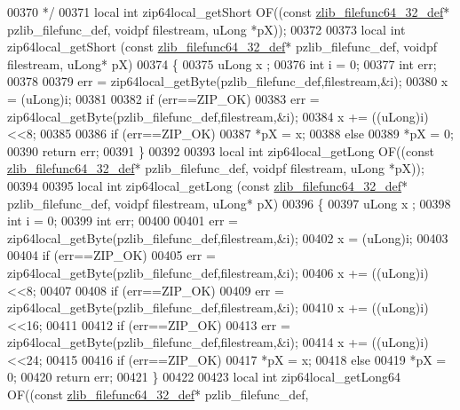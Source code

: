 \begin{DoxyCode}
00370 \textcolor{comment}{*/}
00371 local \textcolor{keywordtype}{int} zip64local\_getShort OF((\textcolor{keyword}{const} \hyperlink{structzlib__filefunc64__32__def__s}{zlib\_filefunc64\_32\_def}* pzlib\_filefunc\_def, 
      voidpf filestream, uLong *pX));
00372 
00373 local \textcolor{keywordtype}{int} zip64local\_getShort (\textcolor{keyword}{const} \hyperlink{structzlib__filefunc64__32__def__s}{zlib\_filefunc64\_32\_def}* pzlib\_filefunc\_def, 
      voidpf filestream, uLong* pX)
00374 \{
00375     uLong x ;
00376     \textcolor{keywordtype}{int} i = 0;
00377     \textcolor{keywordtype}{int} err;
00378 
00379     err = zip64local\_getByte(pzlib\_filefunc\_def,filestream,&i);
00380     x = (uLong)i;
00381 
00382     \textcolor{keywordflow}{if} (err==ZIP\_OK)
00383         err = zip64local\_getByte(pzlib\_filefunc\_def,filestream,&i);
00384     x += ((uLong)i)<<8;
00385 
00386     \textcolor{keywordflow}{if} (err==ZIP\_OK)
00387         *pX = x;
00388     \textcolor{keywordflow}{else}
00389         *pX = 0;
00390     \textcolor{keywordflow}{return} err;
00391 \}
00392 
00393 local \textcolor{keywordtype}{int} zip64local\_getLong OF((\textcolor{keyword}{const} \hyperlink{structzlib__filefunc64__32__def__s}{zlib\_filefunc64\_32\_def}* pzlib\_filefunc\_def, 
      voidpf filestream, uLong *pX));
00394 
00395 local \textcolor{keywordtype}{int} zip64local\_getLong (\textcolor{keyword}{const} \hyperlink{structzlib__filefunc64__32__def__s}{zlib\_filefunc64\_32\_def}* pzlib\_filefunc\_def, 
      voidpf filestream, uLong* pX)
00396 \{
00397     uLong x ;
00398     \textcolor{keywordtype}{int} i = 0;
00399     \textcolor{keywordtype}{int} err;
00400 
00401     err = zip64local\_getByte(pzlib\_filefunc\_def,filestream,&i);
00402     x = (uLong)i;
00403 
00404     \textcolor{keywordflow}{if} (err==ZIP\_OK)
00405         err = zip64local\_getByte(pzlib\_filefunc\_def,filestream,&i);
00406     x += ((uLong)i)<<8;
00407 
00408     \textcolor{keywordflow}{if} (err==ZIP\_OK)
00409         err = zip64local\_getByte(pzlib\_filefunc\_def,filestream,&i);
00410     x += ((uLong)i)<<16;
00411 
00412     \textcolor{keywordflow}{if} (err==ZIP\_OK)
00413         err = zip64local\_getByte(pzlib\_filefunc\_def,filestream,&i);
00414     x += ((uLong)i)<<24;
00415 
00416     \textcolor{keywordflow}{if} (err==ZIP\_OK)
00417         *pX = x;
00418     \textcolor{keywordflow}{else}
00419         *pX = 0;
00420     \textcolor{keywordflow}{return} err;
00421 \}
00422 
00423 local \textcolor{keywordtype}{int} zip64local\_getLong64 OF((\textcolor{keyword}{const} \hyperlink{structzlib__filefunc64__32__def__s}{zlib\_filefunc64\_32\_def}* pzlib\_filefunc\_def, 

\end{DoxyCode}
